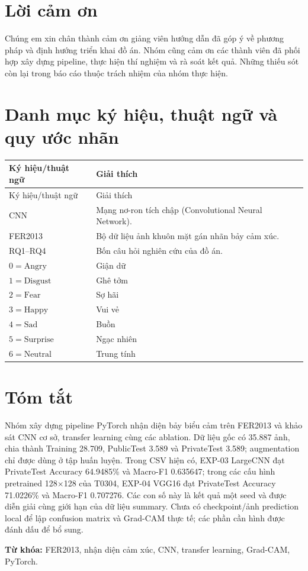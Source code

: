 \chapter*{Lời cảm ơn}
Chúng em xin chân thành cảm ơn giảng viên hướng dẫn đã góp ý về phương pháp và định hướng triển khai đồ án. Nhóm cũng cảm ơn các thành viên đã phối hợp xây dựng pipeline, thực hiện thí nghiệm và rà soát kết quả. Những thiếu sót còn lại trong báo cáo thuộc trách nhiệm của nhóm thực hiện.

\tableofcontents
\listoffigures
\listoftables

\chapter*{Danh mục ký hiệu, thuật ngữ và quy ước nhãn}
\begin{longtable}{p{}p{}}
\toprule
Ký hiệu/thuật ngữ & Giải thích \\
\midrule
\endfirsthead
\toprule Ký hiệu/thuật ngữ & Giải thích \\
\midrule
\endhead
CNN & Mạng nơ-ron tích chập (Convolutional Neural Network). \\
FER2013 & Bộ dữ liệu ảnh khuôn mặt gán nhãn bảy cảm xúc. \\
RQ1--RQ4 & Bốn câu hỏi nghiên cứu của đồ án. \\
$0 = \text{Angry}$ & Giận dữ \\
$1 = \text{Disgust}$ & Ghê tởm \\
$2 = \text{Fear}$ & Sợ hãi \\
$3 = \text{Happy}$ & Vui vẻ \\
$4 = \text{Sad}$ & Buồn \\
$5 = \text{Surprise}$ & Ngạc nhiên \\
$6 = \text{Neutral}$ & Trung tính \\

\bottomrule
\end{longtable}

\chapter*{Tóm tắt}
Nhóm xây dựng pipeline PyTorch nhận diện bảy biểu cảm trên FER2013 và khảo sát CNN cơ sở, transfer learning cùng các ablation. Dữ liệu gốc có 35.887 ảnh, chia thành Training 28.709, PublicTest 3.589 và PrivateTest 3.589; augmentation chỉ được dùng ở tập huấn luyện. Trong CSV hiện có, EXP-03 LargeCNN đạt PrivateTest Accuracy 64.9485\% và Macro-F1 0.635647; trong các cấu hình pretrained 128\ensuremath{\times}128 của T0304, EXP-04 VGG16 đạt PrivateTest Accuracy 71.0226\% và Macro-F1 0.707276. Các con số này là kết quả một seed và được diễn giải cùng giới hạn của dữ liệu summary. Chưa có checkpoint/ảnh prediction local để lập confusion matrix và Grad-CAM thực tế; các phần cần hình được đánh dấu để bổ sung.

\noindent\textbf{Từ khóa:} FER2013, nhận diện cảm xúc, CNN, transfer learning, Grad-CAM, PyTorch.